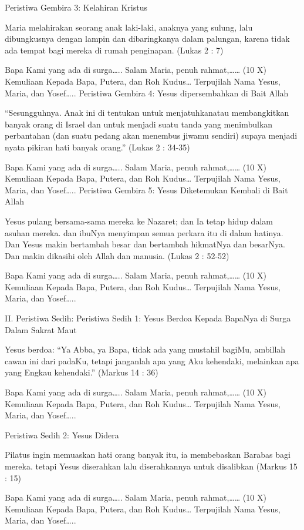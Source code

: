 \documentclass[a5paper,headsepline,titlepage,11pt,nnormalheadings,DIVcalc]{scrbook}
\begin{document}
	Peristiwa Gembira 3: Kelahiran Kristus

Maria melahirakan seorang anak laki-laki, anaknya yang sulung, lalu dibungkusnya dengan lampin dan dibaringkanya dalam palungan, karena tidak ada tempat bagi mereka di rumah penginapan.
(Lukas 2 : 7)

Bapa Kami yang ada di surga…..
Salam Maria, penuh rahmat,…… (10 X)
Kemuliaan Kepada Bapa, Putera, dan Roh Kudus…
Terpujilah Nama Yesus, Maria, dan Yosef…..
	Peristiwa Gembira 4: Yesus dipersembahkan di Bait Allah

“Sesungguhnya. Anak ini di tentukan untuk menjatuhkanatau membangkitkan banyak orang di Israel dan untuk menjadi suatu tanda yang menimbulkan perbantahan (dan suatu pedang akan menembus jiwamu sendiri) supaya menjadi nyata pikiran hati banyak orang.”
(Lukas 2 : 34-35)

Bapa Kami yang ada di surga…..
Salam Maria, penuh rahmat,…… (10 X)
Kemuliaan Kepada Bapa, Putera, dan Roh Kudus…
Terpujilah Nama Yesus, Maria, dan Yosef…..
	Peristiwa Gembira 5: Yesus Diketemukan Kembali di Bait Allah

Yesus pulang bersama-sama mereka ke Nazaret; dan Ia tetap hidup dalam asuhan mereka. dan ibuNya menyimpan semua perkara itu di dalam hatinya. Dan Yesus makin bertambah besar dan bertambah hikmatNya dan besarNya. Dan makin dikasihi oleh Allah dan manusia.
(Lukas 2 : 52-52)

Bapa Kami yang ada di surga…..
Salam Maria, penuh rahmat,…… (10 X)
Kemuliaan Kepada Bapa, Putera, dan Roh Kudus…
Terpujilah Nama Yesus, Maria, dan Yosef…..


II. Peristiwa Sedih:
	Peristiwa Sedih 1: Yesus Berdoa Kepada BapaNya di Surga Dalam Sakrat Maut

Yesus berdoa: “Ya Abba, ya Bapa, tidak ada yang mustahil bagiMu, ambillah cawan ini dari padaKu, tetapi janganlah apa yang Aku kehendaki, melainkan apa yang Engkau kehendaki.”
(Markus 14 : 36)

Bapa Kami yang ada di surga…..
Salam Maria, penuh rahmat,…… (10 X)
Kemuliaan Kepada Bapa, Putera, dan Roh Kudus…
Terpujilah Nama Yesus, Maria, dan Yosef…..

	Peristiwa Sedih 2: Yesus Didera

Pilatus ingin memuaskan hati orang banyak itu, ia membebaskan Barabas bagi mereka. tetapi Yesus diserahkan lalu diserahkannya untuk disalibkan
(Markus 15 : 15)

Bapa Kami yang ada di surga…..
Salam Maria, penuh rahmat,…… (10 X)
Kemuliaan Kepada Bapa, Putera, dan Roh Kudus…
Terpujilah Nama Yesus, Maria, dan Yosef…..
\end{document}
